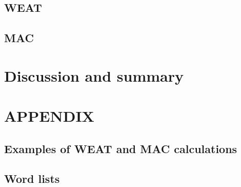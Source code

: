 \documentclass[
  10pt,
  dvipsnames,enabledeprecatedfontcommands, twocolumn]{scrartcl}
\begin{document}
\hypertarget{weat}{%
\subsection{WEAT}\label{weat}}

\hypertarget{mac}{%
\subsection{MAC}\label{mac}}

\hypertarget{discussion-and-summary}{%
\section{Discussion and summary}\label{discussion-and-summary}}

\hypertarget{appendix}{%
\section{APPENDIX}\label{appendix}}

\hypertarget{examples-of-weat-and-mac-calculations}{%
\subsection{Examples of WEAT and MAC
calculations}\label{examples-of-weat-and-mac-calculations}}

\hypertarget{word-lists}{%
\subsection*{Word lists}\label{word-lists}}
\end{document}
